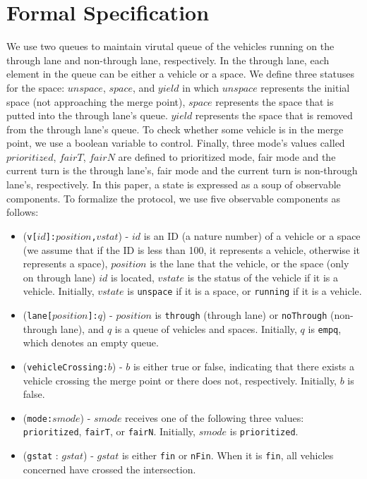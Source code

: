 \documentclass[10pt, conference, compsocconf]{IEEEtran}
\begin{document}
\section{Formal Specification}
 \label{sect_formal}
We use two queues to maintain virutal queue of the vehicles running 
on the through lane and non-through lane, respectively.
In the through lane, each element in the queue can be either a vehicle or a space.
We define three statuses for the space: $unspace$, $space$, and $yield$ in which
$unspace$ represents the initial space (not approaching the merge point), 
$space$ represents the space that is putted into the through lane's queue.
$yield$ represents the space that is removed from the through lane's queue.
To check whether some vehicle is in the merge point, we use a boolean variable to control.
Finally, three mode's values called $prioritized$, $fairT$, $fairN$ are defined to 
prioritized mode, fair mode and the current turn is the through lane's, fair mode and
the current turn is non-through lane's, respectively.
In this paper, a state is expressed as a soup of observable components.
To formalize the protocol, we use five observable components as follows:
\begin{itemize}
  \item (\verb!v[!$id$\verb!]:!$position$\verb!,!$vstat$) - $id$ is an ID (a nature number) of 
  a vehicle or a space (we assume that if the ID is less than 100, it represents a vehicle, otherwise it 
  represents a space), 
  $position$ is the lane that the vehicle, or the space (only on through lane) $id$ is located, 
  $vstate$ is the status of the vehicle if it is a 
  vehicle. Initially, $vstate$ is \verb!unspace! if it is a space, or \verb!running! if it is a vehicle.

  \item (\verb!lane[!$position$\verb!]:!$q$) - $position$ is \verb!through! (through lane) or 
  \verb!noThrough! (non-through lane), and $q$ is a queue of vehicles and spaces.
  Initially, $q$ is \verb!empq!, which denotes an empty queue.
    
  \item (\verb!vehicleCrossing:!$b$) - $b$ is either true or false, indicating that there 
  exists a vehicle crossing the merge point or there does not, respectively. Initially, $b$ is false.
  
  \item (\verb!mode:!$smode$) - $smode$ receives one of the following three values: 
  \verb!prioritized!, \verb!fairT!, or \verb!fairN!.
  Initially, $smode$ is \verb!prioritized!.
  
  \item (\verb!gstat! : $gstat$) -  $gstat$ is either \verb!fin! or \verb!nFin!.
  When it is \verb!fin!, all vehicles concerned have crossed the intersection.
\end{itemize}
\end{document}
